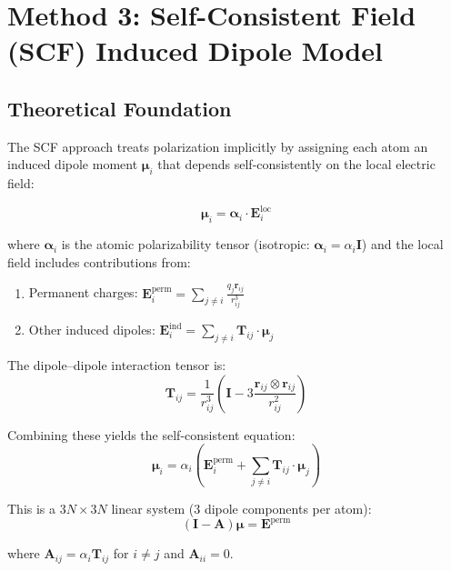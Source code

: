 \documentclass[11pt,letterpaper]{article}
\newcommand{\vr}{\mathbf{r}}
\newcommand{\vE}{\mathbf{E}}
\newcommand{\vmu}{\boldsymbol{\mu}}
\newcommand{\valpha}{\boldsymbol{\alpha}}
\begin{document}
\section{Method 3: Self-Consistent Field (SCF) Induced Dipole Model}
\label{sec:scf}

\subsection{Theoretical Foundation}

The SCF approach treats polarization implicitly by assigning each atom an induced dipole moment $\vmu_i$ that depends self-consistently on the local electric field\cite{thole1981,applequist1972}:

\begin{equation}
\vmu_i = \valpha_i \cdot \vE_i^{\text{loc}}
\label{eq:induced_dipole}
\end{equation}

where $\valpha_i$ is the atomic polarizability tensor (isotropic: $\valpha_i = \alpha_i \mathbf{I}$) and the local field includes contributions from:
\begin{enumerate}
    \item Permanent charges: $\vE_i^{\text{perm}} = \sum_{j \neq i} \frac{q_j \vr_{ij}}{r_{ij}^3}$
    \item Other induced dipoles: $\vE_i^{\text{ind}} = \sum_{j \neq i} \mathbf{T}_{ij} \cdot \vmu_j$
\end{enumerate}

The dipole--dipole interaction tensor is:
\begin{equation}
\mathbf{T}_{ij} = \frac{1}{r_{ij}^3} \left( \mathbf{I} - 3 \frac{\vr_{ij} \otimes \vr_{ij}}{r_{ij}^2} \right)
\end{equation}

Combining these yields the self-consistent equation:
\begin{equation}
\vmu_i = \alpha_i \left( \vE_i^{\text{perm}} + \sum_{j \neq i} \mathbf{T}_{ij} \cdot \vmu_j \right)
\label{eq:scf_equation}
\end{equation}

This is a $3N \times 3N$ linear system (3 dipole components per atom):
\begin{equation}
\left( \mathbf{I} - \mathbf{A} \right) \boldsymbol{\mu} = \mathbf{E}^{\text{perm}}
\end{equation}

where $\mathbf{A}_{ij} = \alpha_i \mathbf{T}_{ij}$ for $i \neq j$ and $\mathbf{A}_{ii} = 0$.
\end{document}
